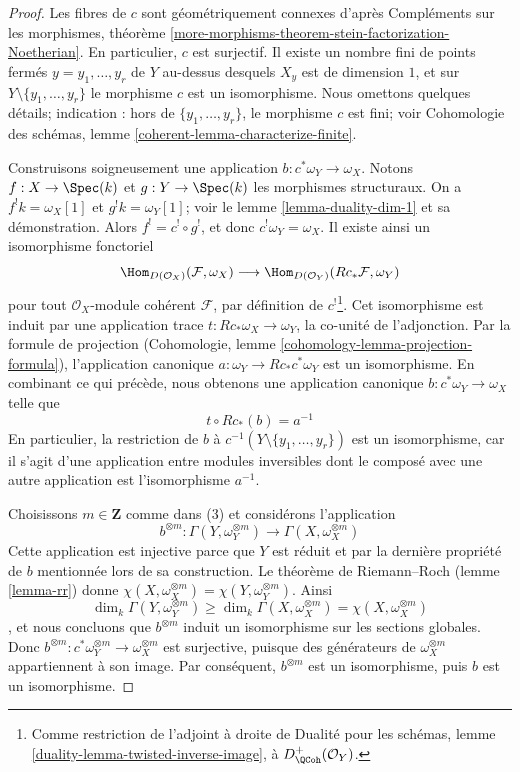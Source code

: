 \begin{proof}
Les fibres de $c$ sont géométriquement connexes d'après Compléments sur les morphismes, théorème \ref{more-morphisms-theorem-stein-factorization-Noetherian}. En particulier, $c$ est surjectif. Il existe un nombre fini de points fermés $y = y_1, \ldots, y_r$ de $Y$ au-dessus desquels $X_y$ est de dimension $1$, et sur $Y \setminus \{y_1, \ldots, y_r\}$ le morphisme $c$ est un isomorphisme. Nous omettons quelques détails; indication : hors de $\{y_1, \ldots, y_r\}$, le morphisme $c$ est fini; voir Cohomologie des schémas, lemme \ref{coherent-lemma-characterize-finite}.

\medskip\noindent
Construisons soigneusement une application $b : c^*\omega_Y \to \omega_X$. Notons $f : X \to \Spec(k)$ et $g : Y \to \Spec(k)$ les morphismes structuraux. On a $f^!k = \omega_X[1]$ et $g^!k = \omega_Y[1]$; voir le lemme \ref{lemma-duality-dim-1} et sa démonstration. Alors $f^! = c^! \circ g^!$, et donc $c^!\omega_Y = \omega_X$. Il existe ainsi un isomorphisme fonctoriel $$
\Hom_{D(\mathcal{O}_X)}(\mathcal{F}, \omega_X)
\longrightarrow
\Hom_{D(\mathcal{O}_Y)}(Rc_*\mathcal{F}, \omega_Y)
$$ pour tout $\mathcal{O}_X$-module cohérent $\mathcal{F}$, par définition de $c^!$\footnote{Comme restriction de l'adjoint à droite de Dualité pour les schémas, lemme \ref{duality-lemma-twisted-inverse-image}, à $D^+_\QCoh(\mathcal{O}_Y)$.}. Cet isomorphisme est induit par une application trace $t : Rc_*\omega_X \to \omega_Y$, la co-unité de l'adjonction. Par la formule de projection (Cohomologie, lemme \ref{cohomology-lemma-projection-formula}), l'application canonique $a : \omega_Y \to Rc_*c^*\omega_Y$ est un isomorphisme. En combinant ce qui précède, nous obtenons une application canonique $b : c^*\omega_Y \to \omega_X$ telle que $$
t \circ Rc_*(b) = a^{-1}
$$ En particulier, la restriction de $b$ à $c^{-1}(Y \setminus \{y_1, \ldots, y_r\})$ est un isomorphisme, car il s'agit d'une application entre modules inversibles dont le composé avec une autre application est l'isomorphisme $a^{-1}$.

\medskip\noindent
Choisissons $m \in \mathbf{Z}$ comme dans (3) et considérons l'application $$
b^{\otimes m} :
\Gamma(Y, \omega_Y^{\otimes m})
\longrightarrow
\Gamma(X, \omega_X^{\otimes m})
$$ Cette application est injective parce que $Y$ est réduit et par la dernière propriété de $b$ mentionnée lors de sa construction. Le théorème de Riemann--Roch (lemme \ref{lemma-rr}) donne $\chi(X, \omega_X^{\otimes m}) =\chi(Y, \omega_Y^{\otimes m})$. Ainsi $$
\dim_k \Gamma(Y, \omega_Y^{\otimes m}) \geq
\dim_k \Gamma(X, \omega_X^{\otimes m}) = \chi(X, \omega_X^{\otimes m})
$$, et nous concluons que $b^{\otimes m}$ induit un isomorphisme sur les sections globales. Donc $b^{\otimes m} : c^*\omega_Y^{\otimes m} \to \omega_X^{\otimes m}$ est surjective, puisque des générateurs de $\omega_X^{\otimes m}$ appartiennent à son image. Par conséquent, $b^{\otimes m}$ est un isomorphisme, puis $b$ est un isomorphisme.
\end{proof}

